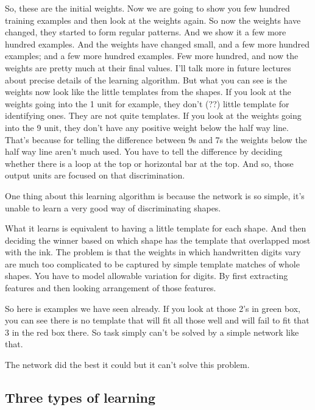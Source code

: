 \begin{multicols}{2}
\begin{footnotesize}
So, these are the initial weights. Now we are going to show you few hundred training examples and then look at the weights again. So now the weights have changed, they started to form regular patterns. And we show it a few more hundred examples. And the weights have changed small, and a few more hundred examples; and a few more hundred examples. Few more hundred, and now the weights are pretty much at their final values. I'll talk more in future lectures about precise details of the learning algorithm. But what you can see is the weights now look like the little templates from the shapes. If you look at the weights going into the 1 unit for example, they don't (??) little template for identifying ones. They are not quite templates. If you look at the weights going into the 9 unit, they don't have any positive weight below the half way line. That's because for telling the difference between 9s and 7s the weights below the half way line aren't much used. You have to tell the difference by deciding whether there is a loop at the top or horizontal bar at the top. And so, those output units are focused on that discrimination. 

One thing about this learning algorithm is because the network is so simple, it's unable to learn a very good way of discriminating shapes. 

What it learns is equivalent to having a little template for each shape. And then deciding the winner based on which shape has the template that overlapped most with the ink. The problem is that the weights in which handwritten digits vary are much too complicated to be captured by simple template matches of whole shapes. You have to model allowable variation for digits. By first extracting features and then looking arrangement of those features. 

So here is examples we have seen already. If you look at those 2's in green box, you can see there is no template that will fit all those well and will fail to fit that 3 in the red box there. So task simply can't be solved by a simple network like that. 

The network did the best it could but it can't solve this problem. 
\end{footnotesize}
\end{multicols}


\subsection{Three types of learning}

